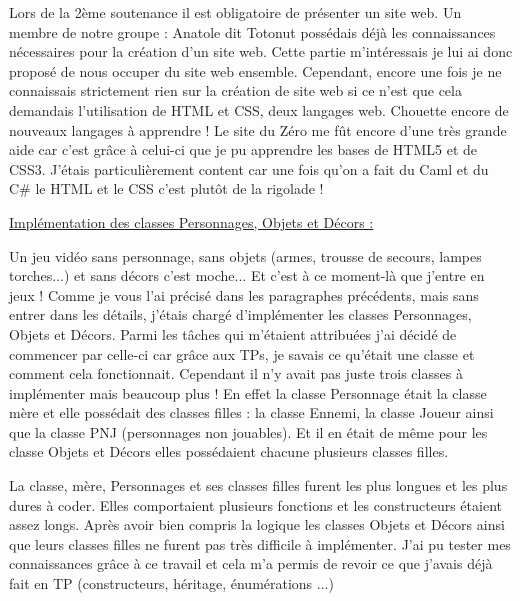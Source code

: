 \documentclass{article}
\begin{document}
\par
Lors de la 2ème soutenance il est obligatoire de présenter un site web. Un membre de notre groupe : Anatole dit Totonut possédais déjà les connaissances nécessaires pour la création d'un site web. Cette partie m'intéressais je lui ai donc proposé de nous occuper du site web ensemble.  Cependant, encore une fois je ne connaissais strictement rien sur la création de site web si ce n'est que cela demandais l'utilisation de HTML et CSS, deux langages web. Chouette encore de nouveaux langages à apprendre ! Le site du Zéro me fût encore d'une très grande aide car c'est grâce à celui-ci que je pu apprendre les bases de HTML5 et de CSS3. J'étais particulièrement content car une fois qu'on a fait du Caml et du C\# le HTML et le CSS c'est plutôt de la rigolade !
\newline

\par
\underline{Implémentation des classes Personnages, Objets et Décors :}
\newline

\par
Un jeu vidéo sans personnage, sans objets (armes, trousse de secours, lampes torches...) et sans décors c'est moche... Et c'est à ce moment-là que j'entre en jeux ! Comme je vous l'ai précisé dans les paragraphes précédents, mais sans entrer dans les détails, j'étais chargé d'implémenter les classes Personnages, Objets et Décors. Parmi les tâches qui m'étaient attribuées j'ai décidé de commencer par celle-ci car grâce aux TPs, je savais ce qu'était une classe et comment cela fonctionnait. Cependant il n'y avait pas juste trois classes à implémenter mais beaucoup plus ! En effet la classe Personnage était la classe mère et elle possédait des classes filles : la classe Ennemi, la classe Joueur ainsi que la classe PNJ (personnages non jouables). Et il en était de même pour les classe Objets et Décors elles possédaient chacune plusieurs classes filles.
\newline

\par
La classe, mère, Personnages et ses classes filles furent les  plus longues et les plus dures à coder. Elles comportaient plusieurs fonctions et les constructeurs étaient assez longs. Après avoir bien compris la logique les classes Objets et Décors ainsi que leurs classes filles  ne furent pas très difficile à implémenter. J'ai pu tester mes connaissances grâce à ce travail et cela m'a permis de revoir ce que j'avais déjà fait en TP (constructeurs, héritage, énumérations ...)   
\newline
\end{document}
